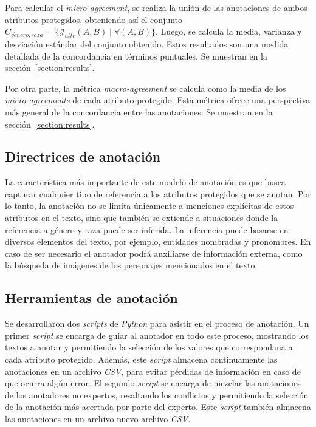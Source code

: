 Para calcular el \emph{micro-agreement}, se realiza la uni\'on de las anotaciones de ambos atributos protegidos, obteniendo as\'i
el conjunto $C_{g\acute{e}nero, raza} = \{\mathcal{J}_{attr}(A, B) \mid \forall (A, B)\}$. Luego, se calcula la media, varianza y
desviaci\'on est\'andar del conjunto obtenido. Estos resultados son una medida detallada de la concordancia en t\'erminos puntuales.
Se muestran en la secci\'on~\ref{section:results}.

Por otra parte, la m\'etrica \emph{macro-agreement} se calcula como la media de los \emph{micro-agreements} de cada atributo protegido. 
Esta m\'etrica ofrece una perspectiva m\'as general de la concordancia entre las anotaciones. Se muestran en la 
secci\'on~\ref{section:results}.

\subsection{Directrices de anotaci\'on}\label{section:annotation_guidelines}
La caracter\'istica m\'as importante de este modelo de anotaci\'on es que busca capturar cualquier tipo de referencia a los atributos 
protegidos que se anotan. Por lo tanto, la anotaci\'on no se limita \'unicamente a menciones expl\'icitas de estos atributos en el 
texto, sino que tambi\'en se extiende a situaciones donde la referencia a g\'enero y raza puede ser inferida. La inferencia puede 
basarse en diversos elementos del texto, por ejemplo, entidades nombradas y pronombres. En caso de ser necesario el anotador podr\'a
auxiliarse de informaci\'on externa, como la b\'usqueda de im\'agenes de los personajes mencionados en el texto.

\subsection{Herramientas de anotaci\'on}
Se desarrollaron dos \emph{scripts} de \emph{Python} para asistir en el proceso de anotaci\'on. Un primer \emph{script}
se encarga de guiar al anotador en todo este proceso, mostrando los textos a anotar y permitiendo la selecci\'on de los valores
que correspondana a cada atributo protegido. Adem\'as, este \emph{script} almacena continuamente las anotaciones en un archivo
\emph{CSV}, para evitar p\'erdidas de informaci\'on en caso de que ocurra alg\'un error. El segundo \emph{script} se encarga de
mezclar las anotaciones de los anotadores no expertos, resaltando los conflictos y permitiendo la selecci\'on de la anotaci\'on
m\'as acertada por parte del experto. Este \emph{script} tambi\'en almacena las anotaciones en un archivo nuevo archivo
\emph{CSV}.

